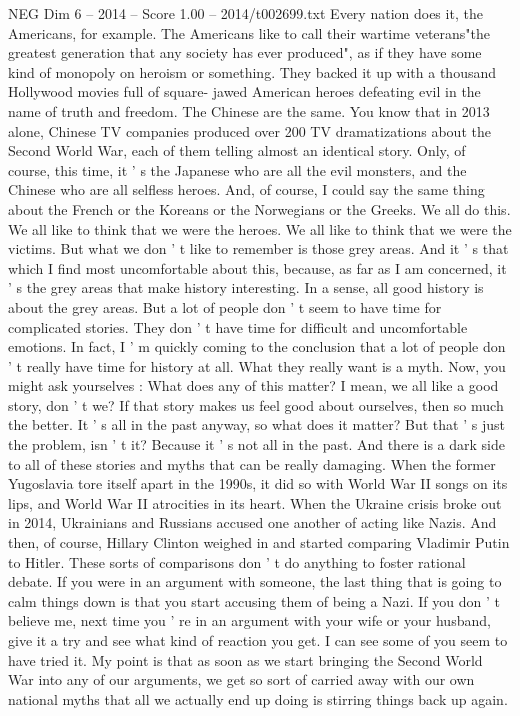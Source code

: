 \begin{textsample}{NEG Dim 6 – 2014 – Score 1.00 – 2014/t002699.txt}
Every nation does it, the Americans, for example.
The Americans like to call their wartime veterans"the greatest generation that any society has ever produced", as if they have some kind of monopoly on heroism or something.
They backed it up with a thousand Hollywood movies full of square- jawed American heroes defeating evil in the name of truth and freedom.
The Chinese are the same.
You know that in 2013 alone, Chinese TV companies produced over 200 TV dramatizations about the Second World War, each of them telling almost an identical story.
Only, of course, this time, it ' s the Japanese who are all the evil monsters, and the Chinese who are all selfless heroes.
And, of course, I could say the same thing about the French or the Koreans or the Norwegians or the Greeks.
We all do this.
We all like to think that we were the heroes.
We all like to think that we were the victims.
But what we don ' t like to remember is those grey areas.
And it ' s that which I find most uncomfortable about this, because, as far as I am concerned, it ' s the grey areas that make history interesting.
In a sense, all good history is about the grey areas.
But a lot of people don ' t seem to have time for complicated stories.
They don ' t have time for difficult and uncomfortable emotions.
In fact, I ' m quickly coming to the conclusion that a lot of people don ' t really have time for history at all.
What they really want is a myth.
Now, you might ask yourselves : What does any of this matter?
I mean, we all like a good story, don ' t we?
If that story makes us feel good about ourselves, then so much the better.
It ' s all in the past anyway, so what does it matter?
But that ' s just the problem, isn ' t it?
Because it ' s not all in the past.
And there is a dark side to all of these stories and myths that can be really damaging.
When the former Yugoslavia tore itself apart in the 1990s, it did so with World War II songs on its lips, and World War II atrocities in its heart.
When the Ukraine crisis broke out in 2014, Ukrainians and Russians accused one another of acting like Nazis.
And then, of course, Hillary Clinton weighed in and started comparing Vladimir Putin to Hitler.
These sorts of comparisons don ' t do anything to foster rational debate.
If you were in an argument with someone, the last thing that is going to calm things down is that you start accusing them of being a Nazi.
If you don ' t believe me, next time you ' re in an argument with your wife or your husband, give it a try and see what kind of reaction you get.
I can see some of you seem to have tried it.
My point is that as soon as we start bringing the Second World War into any of our arguments, we get so sort of carried away with our own national myths that all we actually end up doing is stirring things back up again.

\end{textsample}
